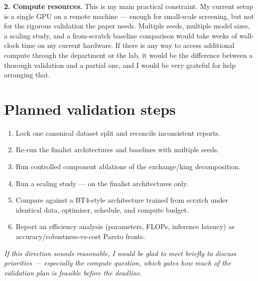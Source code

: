 \documentclass[11pt,a4paper]{article}
\begin{document}
\textbf{2. Compute resources.} This is my main practical constraint. My current setup is a
single GPU on a remote machine --- enough for small-scale screening, but not for the
rigorous validation the paper needs. Multiple seeds, multiple model sizes, a scaling study,
and a from-scratch baseline comparison would take weeks of wall-clock time on my current
hardware. If there is any way to access additional compute through the department or the
lab, it would be the difference between a thorough validation and a partial one, and I would
be very grateful for help arranging that.

\section{Planned validation steps}

\begin{enumerate}
  \item Lock one canonical dataset split and reconcile inconsistent reports.
  \item Re-run the finalist architectures and baselines with multiple seeds.
  \item Run controlled component ablations of the exchange/king decomposition.
  \item Run a scaling study --- on the finalist architectures only.
  \item Compare against a BT4-style architecture trained from scratch under identical data,
  optimiser, schedule, and compute budget.
  \item Report an efficiency analysis (parameters, FLOPs, inference latency) as
  accuracy/robustness-vs-cost Pareto fronts.
\end{enumerate}

\vspace{0.3cm}
\noindent{\color{rule}\rule{\linewidth}{0.6pt}}

\vspace{0.15cm}
\noindent\textit{\color{forest} If this direction sounds reasonable, I would be glad to meet
briefly to discuss priorities --- especially the compute question, which gates how much of
the validation plan is feasible before the deadline.}
\end{document}
